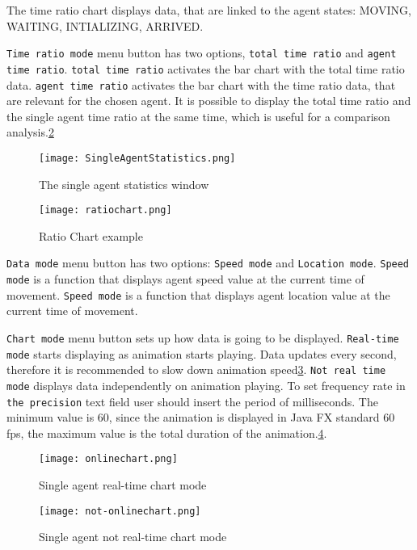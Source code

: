 \documentclass[thesis=B,english]{FITthesis}[2019/12/23]
\begin{document}
The time ratio chart displays data, that are linked to the agent states: MOVING, WAITING, INTIALIZING, ARRIVED. 

\verb|Time ratio mode| menu button has two options, \verb|total time ratio| and \verb|agent time ratio|. \verb|total time ratio| activates the bar chart with the total time ratio data. \verb|agent time ratio| activates the bar chart with the time ratio data, that are relevant for the chosen agent. It is possible to display the total time ratio and the single agent time ratio at the same time, which is useful for a comparison analysis.\ref{fig:float30}

\begin{figure}
	\texttt{[image: SingleAgentStatistics.png]}
	\caption[Single Agent Statistics]{The single agent statistics window}\label{fig:float29}
\end{figure}

\begin{figure}
	\texttt{[image: ratiochart.png]}
	\caption[Ratio Chart example]{Ratio Chart example}\label{fig:float30}
\end{figure}



\verb|Data mode| menu button has two options: \verb|Speed mode| and \verb|Location mode|. \verb|Speed mode| is a function that displays agent speed value at the current time of movement. \verb|Speed mode| is a function that displays agent location value at the current time of movement.

\verb|Chart mode| menu button sets up how data is going to be displayed. \verb|Real-time mode| starts displaying as animation starts playing. Data updates every second, therefore it is recommended to slow down animation speed\ref{fig:float31}. \verb|Not real time mode| displays data independently on animation playing. To set frequency rate in \verb|the precision| text field user should insert the period of milliseconds. The minimum value is 60, since the animation is displayed in Java FX standard 60 fps,  the maximum value is the total duration of the animation.\ref{fig:float32}.  

\begin{figure}
	\texttt{[image: onlinechart.png]}
	\caption[Online chart mode]{Single agent real-time chart mode}\label{fig:float31}
\end{figure}

\begin{figure}
	\texttt{[image: not-onlinechart.png]}
	\caption[Not Online chart mode]{Single agent not real-time chart mode}\label{fig:float32}
\end{figure}
\end{document}
